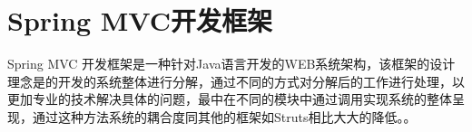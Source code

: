 

\section{Spring MVC开发框架}
Spring MVC 开发框架是一种针对Java语言开发的WEB系统架构，该框架的设计理念是的开发的系统整体进行分解，通过不同的方式对分解后的工作进行处理，以更加专业的技术解决具体的问题，最中在不同的模块中通过调用实现系统的整体呈现，通过这种方法系统的耦合度同其他的框架如Struts相比大大的降低。\cite{林薇2015基于}。

